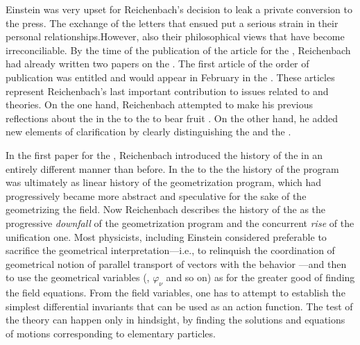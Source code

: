 \documentclass[draft]{article}
\newcommand{\PRZL}{\citetitle{Reichenbach1928}\xspace}
\newcommand{\VZ}{\jt{Vossische Zeitung}\xspace}
\newcommand{\FP}{\german{Fernparallelismus}\xspace}
\begin{document}
Einstein was very upset for Reichenbach's decision to leak a private conversion to the press. The exchange of the letters that ensued put a serious strain in their personal relationships.However, also their philosophical views that have become irreconciliable. By the time of the publication of the article for the \VZ, Reichenbach had already written two papers on the \FP. The first article of the order of publication was entitled  \citep{Reichenbach1929b} and would appear in February in the .  These articles represent Reichenbach's last important contribution to issues related to \rt and \spti theories. On the one hand, Reichenbach attempted to make his previous reflections about the \uftp in the \Ap to the \PRZL to bear fruit \citep[\S46]{Reichenbach1928}. On the other hand, he added new elements of clarification by clearly distinguishing the  and the . 

In the first paper for the , Reichenbach introduced the history of the \uft in an entirely different manner than before. In the \Ap to the \PRZL the history of the \uftp program was ultimately as linear history of the geometrization program, which had progressively became more abstract and speculative for the sake of the geometrizing the field. Now Reichenbach describes the history of the \uft as the progressive \emph{downfall} of the geometrization program and the concurrent \emph{rise} of the unification one. Most physicists, including Einstein  considered  preferable to sacrifice the geometrical interpretation---i.e., to relinquish the coordination of geometrical notion of parallel transport of vectors with the behavior \rac---and then to use the geometrical variables (\Gtmn, $\varphi_\nu$ and so on) as  for the greater good of finding the field equations. From the field variables, one has to attempt to establish the simplest differential invariants that can be used as an action function. The test of the theory can happen only in hindsight, by finding the solutions and equations of motions corresponding to elementary particles. 
\end{document}
